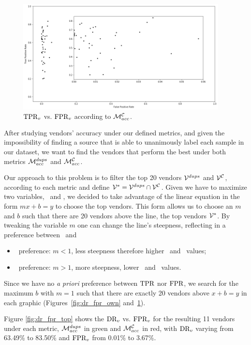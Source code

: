 \begin{figure}[!htb]
	\centering
	\includegraphics[width=0.95\textwidth]{Figures/dr_fpr_d.png}
	\caption{$\textrm{TPR}_v$ vs. $\textrm{FPR}_v$ according to $\mathcal{M}_{acc}^{\mathcal{C}}$.}
	\label{fig:dr_fpr_d}
\end{figure}

After studying vendors' accuracy under our defined metrics, and given the impossibility of finding a source that is able to unanimously label each sample in our dataset, we want to find the vendors that perform the best under both metrics $\mathcal{M}_{acc}^{{dups}}$ and $\mathcal{M}_{acc}^{\mathcal{C}}$.

Our approach to this problem is to filter the top 20 vendors $\mathcal{V}^{{dups}}$ and $\mathcal{V}^{\mathcal{C}}$, according to each metric and define $\mathcal{V}^*=\mathcal{V}^{{dups}}\cap\mathcal{V}^{\mathcal{C}}$.
Given we have to maximize two variables, \tpr\ and \fpr, we decided to take advantage of the linear equation in the form $mx+b=y$ to choose the top vendors.
This form allows us to choose an $m$ and $b$ such that there are 20 vendors above the line, the top vendors $\mathcal{V}^*$.
By tweaking the variable $m$ one can change the line's steepness, reflecting in a preference between \tpr\ and \fpr\:

\begin{itemize}
	\item \tpr\ preference: $m < 1$, less steepness therefore higher \fpr\ and \tpr\ values;
	\item \fpr\ preference: $m > 1$, more steepness, lower \fpr\ and \tpr\ values.
\end{itemize}

Since we have no \emph{a priori} preference between $\textrm{TPR}$ nor $\textrm{FPR}$, we search for the maximum $b$ with $m=1$ such that there are exactly 20 vendors above $x+b=y$ in each graphic (Figures~\ref{fig:dr_fpr_own} and~\ref{fig:dr_fpr_d}).

Figure \ref{fig:dr_fpr_top} shows the $\textrm{DR}_v$ vs. $\textrm{FPR}_v$ for the resulting 11 vendors under each metric, $\mathcal{M}_{acc}^{{dups}}$ in green and $\mathcal{M}_{acc}^{\mathcal{C}}$ in red, with $\textrm{DR}_v$ varying from 63.49\% to 83.50\% and $\textrm{FPR}_v$ from 0.01\% to 3.67\%.

